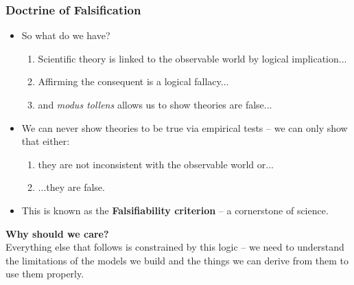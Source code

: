 \documentclass[aspectratio=169]{beamer}
\theoremstyle{principle}
\begin{document}
\begin{frame}
\frametitle{Doctrine of Falsification}
\begin{itemize}
\item So what do we have?
\begin{enumerate}
\item Scientific theory is linked to the observable world by logical implication...
\item Affirming the consequent is a logical fallacy...
\item and \textit{modus tollens} allows us to show theories are false...
\end{enumerate}
\bigskip
\bigskip
\item We can never show theories to be true via empirical tests -- we can only show that either:
\begin{enumerate}
\item they are not inconsistent with the observable world or...
\item ...they are false.
\end{enumerate}
\bigskip
\bigskip
\item This is known as the \textbf{Falsifiability criterion} -- a cornerstone of science.
\end{itemize}

\end{frame}

\begin{frame}

\begin{center}
\Huge\textbf{Why should we care?}\\
\bigskip
\bigskip
\large Everything else that follows is constrained by this logic -- we need to understand the limitations of the models we build and the things we can derive from them to use them properly.\\
\end{center}

\end{frame}

\end{document}
